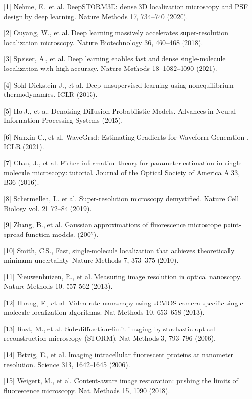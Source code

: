 \documentclass{article}
\begin{document}
{
\small


[1] Nehme, E., et al. DeepSTORM3D: dense 3D localization microscopy and PSF design by deep learning. Nature Methods 17, 734–740 (2020).


[2] Ouyang, W., et al. Deep learning massively accelerates super-resolution localization microscopy. Nature Biotechnology 36, 460–468 (2018).


[3] Speiser, A., et al. Deep learning enables fast and dense single-molecule localization with high accuracy. Nature Methods 18, 1082–1090 (2021).

[4] Sohl-Dickstein J., et al. Deep unsupervised learning using nonequilibrium thermodynamics. ICLR (2015).

[5] Ho J., et al. Denoising Diffusion Probabilistic Models. Advances in Neural Information Processing Systems (2015).

[6] Nanxin C., et al. WaveGrad: Estimating Gradients for Waveform Generation
. ICLR (2021).

[7] Chao, J., et al. Fisher information theory for parameter estimation in single molecule microscopy: tutorial. Journal of the Optical Society of America A 33, B36 (2016). 

[8] Schermelleh, L. et al. Super-resolution microscopy demystified. Nature Cell Biology vol. 21 72–84 (2019). 

[9] Zhang, B., et al. Gaussian approximations of fluorescence microscope point-spread function models. (2007). 

[10] Smith, C.S.,  Fast, single-molecule localization that achieves theoretically minimum uncertainty. Nature Methods 7, 373–375 (2010). 

[11] Nieuwenhuizen, R., et al. Measuring image resolution in optical nanoscopy. Nature Methods 10. 557-562 (2013). 

[12] Huang, F., et al. Video-rate nanoscopy using sCMOS camera-specific single-molecule localization algorithms. Nat Methods 10, 653–658 (2013). 

[13] Rust, M., et al. Sub-diffraction-limit imaging by stochastic optical reconstruction microscopy (STORM). Nat Methods 3, 793–796 (2006).

[14] Betzig, E., et al. Imaging intracellular fluorescent proteins at nanometer resolution. Science 313, 1642–1645 (2006).

[15] Weigert, M., et al. Content-aware image restoration: pushing the limits of fluorescence microscopy. Nat. Methods 15, 1090 (2018).

}
\end{document}
